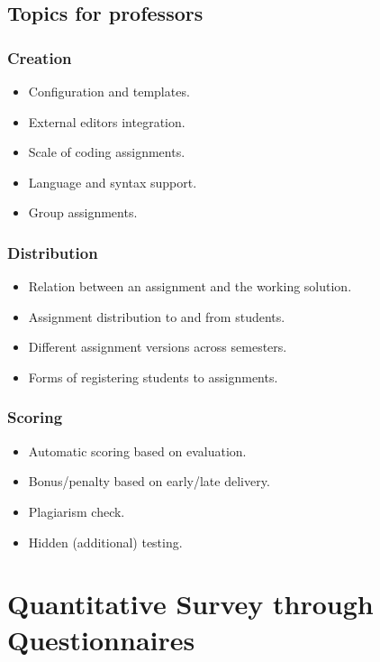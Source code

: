 \subsection{Topics for professors} \label{ssec:prof}

\subsubsection{Creation}

\begin{itemize}
\item
  {Configuration and templates.}
\item
  {External editors integration.}
\item
  {Scale of coding assignments.}
\item
  {Language and syntax support.}
\item
  {Group assignments.}
\end{itemize}

\subsubsection{Distribution}

\begin{itemize}
\item
  {Relation between an assignment and the working solution.}
\item
  {Assignment distribution to and from students.}
\item
  {Different assignment versions across semesters.}
\item
  {Forms of registering students to assignments.}
\end{itemize}

\subsubsection{Scoring}

\begin{itemize}
\item
  {Automatic scoring based on evaluation.}
\item
  {Bonus/penalty based on early/late delivery.}
\item
  {Plagiarism check.}
\item
  {Hidden (additional) testing.}
\end{itemize}

\section{Quantitative Survey through Questionnaires} \label{sec:quantitative}

